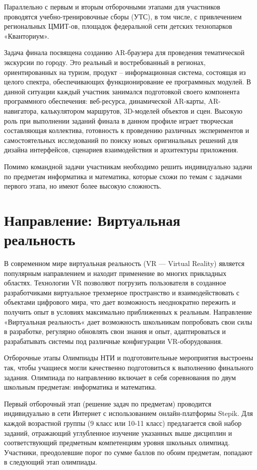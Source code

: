 Параллельно с первым и вторым отборочными этапами для участников проводятся учебно-тренировочные сборы (УТС), в том числе, с привлечением региональных ЦМИТ-ов, площадок федеральной сети детских технопарков «Кванториум». 

Задача финала посвящена созданию AR-браузера для проведения тематической экскурсии по городу. Это реальный и востребованный в регионах, ориентированных на туризм, продукт – информационная система, состоящая из целого спектра, обеспечивающих функционирование ее программных модулей. В данной ситуации каждый участник занимался подготовкой своего компонента программного обеспечения: веб-ресурса, динамической AR-карты, AR-навигатора, калькулятором маршрутов, 3D-моделей объектов и сцен. Высокую роль при выполнении заданий финала в данном профиле играет творческая составляющая коллектива, готовность к проведению различных экспериментов и самостоятельных исследований по поиску новых оригинальных решений для дизайна интерфейсов, сценариев взаимодействия и архитектуры приложения. 

Помимо командной задачи участникам необходимо решить индивидуально задачи по предметам информатика и математика, которые схожи по темам с задачами первого этапа, но имеют более высокую сложность.

\section*{Направление: Виртуальная реальность}

В современном мире виртуальная реальность (VR — Virtual Reality) является популярным направлением и находит применение во многих прикладных областях. Технологии VR позволяют погрузить пользователя в созданное разработчиками виртуальное трехмерное пространство и взаимодействовать с объектами цифрового мира, что дает возможность неоднократно пережить и получить опыт в условиях максимально приближенных к реальным. Направление «Виртуальная реальность« дает возможность школьникам попробовать свои силы в разработке, регулярно обновлять свои знания и опыт, адаптироваться и разрабатывать системы под различные конфигурации VR-оборудования. 

Отборочные этапы Олимпиады НТИ и подготовительные мероприятия выстроены так, чтобы учащиеся могли качественно подготовиться к выполнению финального задания. Олимпиада по направлению включает в себя соревнования по двум школьным предметам: информатика и математика. 

Первый отборочный этап (решение задач по предметам) проводится индивидуально в сети Интернет с использованием онлайн-платформы Stepik. Для каждой возрастной группы (9 класс или 10-11 класс) предлагается свой набор заданий, отражающий углубленное изучение указанных выше дисциплин и соответствующий предметным компетенциям уровня школьных олимпиад. Участники, преодолевшие порог по сумме баллов по обоим предметам, попадают в следующий этап олимпиады.

